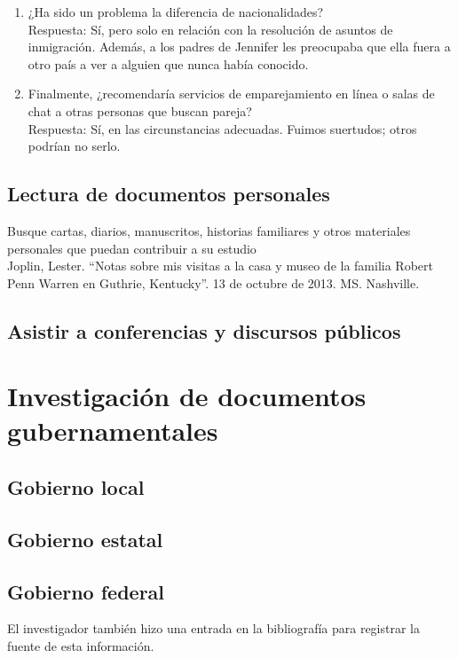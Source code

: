 \begin{enumerate}[1.]
    \item ¿Ha sido un problema la diferencia de nacionalidades?\\
	Respuesta: Sí, pero solo en relación con la resolución de asuntos de inmigración. Además, a los padres de Jennifer les preocupaba que ella fuera a otro país a ver a alguien que nunca había conocido. 
    \item Finalmente, ¿recomendaría servicios de emparejamiento en línea o salas de chat a otras personas que buscan pareja?\\
	Respuesta: Sí, en las circunstancias adecuadas. Fuimos suertudos; otros podrían no serlo.
\end{enumerate}

\subsection{Lectura de documentos personales}
Busque cartas, diarios, manuscritos, historias familiares y otros materiales personales que puedan contribuir a su estudio\\

Joplin, Lester. “Notas sobre mis visitas a la casa y museo de la familia Robert Penn Warren en Guthrie, Kentucky”. 13 de octubre de 2013. MS. Nashville.

\subsection{Asistir a conferencias y discursos públicos}

\section{Investigación de documentos gubernamentales}

\subsection{Gobierno local}

\subsection{Gobierno estatal}

\subsection{Gobierno federal}

El investigador también hizo una entrada en la bibliografía para registrar la fuente de esta información.\\

